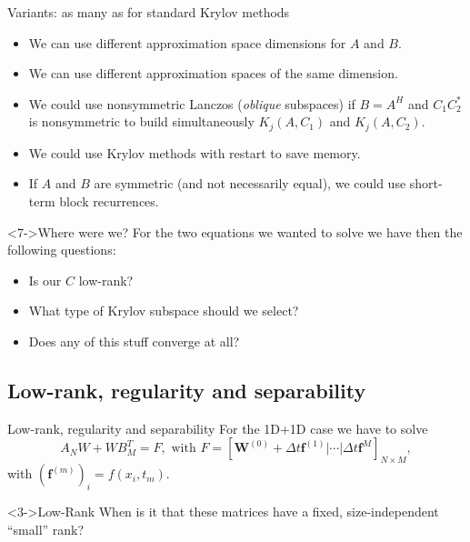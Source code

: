 \documentclass[aspectratio=169,xcolor=dvipsnames]{beamer}
\begin{document}
	\begin{frame}{Variants: as many as for standard Krylov methods}
	\begin{itemize}
		\item[\faArrowCircleRight]<1-> We can use different approximation space dimensions for $A$ and $B$.
		\item[\faArrowCircleRight]<2-> We can use different approximation spaces of the same dimension.
		\item[\faArrowCircleRight]<3-> We could use nonsymmetric Lanczos (\emph{oblique} subspaces) if $B = A^H$ and $C_1 C_2^*$ is nonsymmetric to build simultaneously $K_j(A,C_1)$ and $K_j(A,C_2)$.
		\item[\faArrowCircleRight]<4-> We could use Krylov methods with restart to save memory.
		\item[\faArrowCircleRight]<5-> If $A$ and $B$ are symmetric (and not necessarily equal), we could use short-term block recurrences.
	\end{itemize}
	
	\begin{exampleblock}<7->{\faQuestionCircle[]\;Where were we?}
	For the two equations we wanted to solve we have then the following questions:
	\begin{itemize}
		\item[\faQuestionCircle] Is our $C$ low-rank?
		\item[\faQuestionCircle] What type of Krylov subspace should we select?
		\item[\faQuestionCircle] Does any of this stuff converge at all?
	\end{itemize}
	\end{exampleblock}
	
	\end{frame}

	\subsection{Low-rank, regularity and separability}
	
	\begin{frame}{Low-rank, regularity and separability}
	\faWrench\;For the 1D+1D case we have to solve
	\[
	A_N W + W B_M^T = F, \text{ with } F = [ \mathbf{W}^{(0)} + \Delta t \mathbf{f}^{(1)}|\cdots| \Delta t \mathbf{f}^{M} ]_{N \times M},
	\]
	with $(\mathbf{f}^{(m)})_i = f(x_i,t_m)$.\vfill
	

	\begin{block}<3->{\faQuestionCircle\;Low-Rank}
	When is it that these matrices have a fixed, size-independent ``small'' rank?
	\end{block}
	\end{frame}
\end{document}
